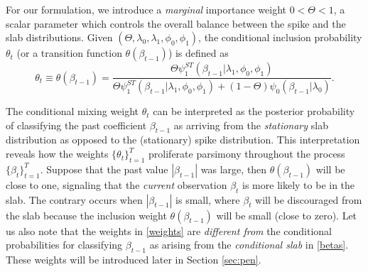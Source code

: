 \documentclass[ba]{imsart}
\numberwithin{equation}{section}
\theoremstyle{plain}
\begin{document}
 For our formulation, we introduce a {\sl marginal} importance weight $0<\Theta<1$, a scalar parameter which controls the overall balance between the spike and the slab distributions. Given $(\Theta,\lambda_0,\lambda_1,\phi_0,\phi_1)$, the conditional inclusion probability $\theta_t$ (or a transition function $\theta(\beta_{t-1})$)  is  defined as
\begin{equation}\label{weights}
\theta_t\equiv\theta(\beta_{t-1})=\frac{\Theta\psi_1^{ST}\left(\beta_{t-1}|\lambda_1,\phi_0,\phi_1\right)}{\Theta\psi_1^{ST}\left(\beta_{t-1}|\lambda_1,\phi_0,\phi_1\right)+(1-\Theta)\psi_0\left(\beta_{t-1}|\lambda_0\right)}.
\end{equation}


\iffalse
Before turning to stationarity properties of the full $DSS$ priors, we pause  to appreciate the probabilistic meaning of \eqref{weights}. 
\fi
The conditional mixing weight $\theta_t$ can be interpreted as the posterior probability of classifying the past coefficient $\beta_{t-1}$ as arriving from the {\sl stationary} slab {distribution} as opposed to the (stationary) spike {distribution}. This interpretation {reveals} how the weights $\{\theta_t\}_{t=1}^T$ proliferate  parsimony throughout the process $\{\beta_t\}_{t=1}^T$. 
Suppose that the past value $|\beta_{t-1}|$ was large, then $\theta(\beta_{t-1})$ will be close to one, signaling that the {\sl current} observation $\beta_t$  is more likely to be in the slab.  The contrary occurs when  $|\beta_{t-1}|$ is small, where $\beta_t$  will be discouraged from the slab because the inclusion weight $\theta(\beta_{t-1})$ will be small (close to zero). {Let us also note that the weights in \eqref{weights}  are {\sl different from} the conditional  probabilities for classifying  $\beta_{t-1}$ as arising from the {\sl conditional slab} in \eqref{betas}.} These weights will be introduced later in Section \ref{sec:pen}.
\end{document}
